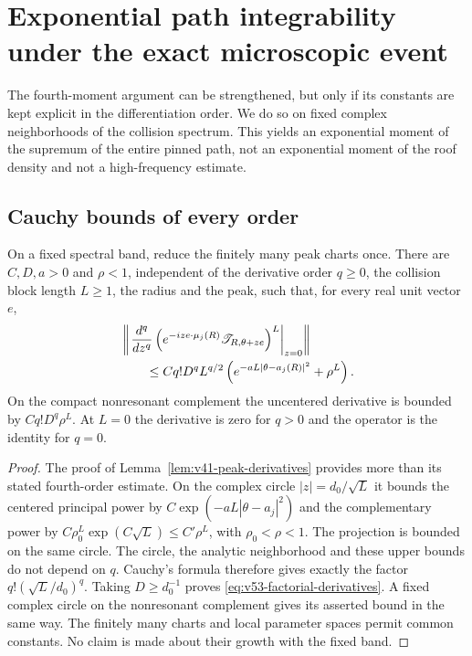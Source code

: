 \section{Exponential path integrability under the exact microscopic event}
\label{sec:v53-exponential-paths}
The fourth-moment argument can be strengthened, but only if its
constants are kept explicit in the differentiation order. We do so on
fixed complex neighborhoods of the collision spectrum. This yields an
exponential moment of the supremum of the entire pinned path, not an
exponential moment of the roof density and not a high-frequency estimate.

\subsection{Cauchy bounds of every order}
\begin{lemma}
\label{lem:v53-factorial-derivatives}
On a fixed spectral band, reduce the finitely many peak charts once.
There are $C,D,a>0$ and $\rho<1$, independent of the derivative order
$q\ge0$, the collision block length $L\ge1$, the radius and the peak,
such that, for every real unit vector $e$,
\begin{align}
 &\left\|\left.\frac{d^q}{dz^q}
 \left(e^{-iz e\cdot\mu_j(R)}\mathscr T_{R,\theta+ze}\right)^L
                                   \right|_{z=0}\right\|\notag\\
 &\qquad\le Cq!D^qL^{q/2}
       \left(e^{-aL|\theta-a_j(R)|^2}+\rho^L\right).
                                      \label{eq:v53-factorial-derivatives}
\end{align}
On the compact nonresonant complement the uncentered derivative is
bounded by $Cq!D^q\rho^L$. At $L=0$ the derivative is zero for
$q>0$ and the operator is the identity for $q=0$.
\end{lemma}
\begin{proof}
The proof of Lemma~\ref{lem:v41-peak-derivatives} provides more than
its stated fourth-order estimate. On the complex circle
$|z|=d_0/\sqrt L$ it bounds the centered principal power by
$C\exp(-aL|\theta-a_j|^2)$ and the complementary power by
$C\rho_0^L\exp(C\sqrt L)\le C'\rho^L$, with
$\rho_0<\rho<1$. The projection is bounded on the same circle.
The circle, the analytic neighborhood and these upper bounds do not
depend on $q$. Cauchy's formula therefore gives exactly the factor
$q!(\sqrt L/d_0)^q$. Taking $D\ge d_0^{-1}$ proves
\eqref{eq:v53-factorial-derivatives}. A fixed complex circle on the
nonresonant complement gives its asserted bound in the same way.
The finitely many charts and local parameter spaces permit common
constants. No claim is made about their growth with the fixed band.
\end{proof}

